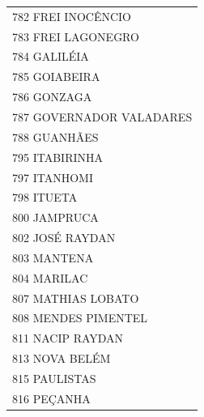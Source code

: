 \documentclass{article}
\begin{document}
\begin{longtable}[c]{m{18cm}}
\multicolumn{1}{l}{ \hspace{2em} 782 FREI INOCÊNCIO } \\
\multicolumn{1}{l}{ \hspace{2em} 783 FREI LAGONEGRO } \\
\multicolumn{1}{l}{ \hspace{2em} 784 GALILÉIA } \\
\multicolumn{1}{l}{ \hspace{2em} 785 GOIABEIRA } \\
\multicolumn{1}{l}{ \hspace{2em} 786 GONZAGA } \\
\multicolumn{1}{l}{ \hspace{2em} 787 GOVERNADOR VALADARES } \\
\multicolumn{1}{l}{ \hspace{2em} 788 GUANHÃES } \\
\multicolumn{1}{l}{ \hspace{2em} 795 ITABIRINHA } \\
\multicolumn{1}{l}{ \hspace{2em} 797 ITANHOMI } \\
\multicolumn{1}{l}{ \hspace{2em} 798 ITUETA } \\
\multicolumn{1}{l}{ \hspace{2em} 800 JAMPRUCA } \\
\multicolumn{1}{l}{ \hspace{2em} 802 JOSÉ RAYDAN } \\
\multicolumn{1}{l}{ \hspace{2em} 803 MANTENA } \\
\multicolumn{1}{l}{ \hspace{2em} 804 MARILAC } \\
\multicolumn{1}{l}{ \hspace{2em} 807 MATHIAS LOBATO } \\
\multicolumn{1}{l}{ \hspace{2em} 808 MENDES PIMENTEL } \\
\multicolumn{1}{l}{ \hspace{2em} 811 NACIP RAYDAN } \\
\multicolumn{1}{l}{ \hspace{2em} 813 NOVA BELÉM } \\
\multicolumn{1}{l}{ \hspace{2em} 815 PAULISTAS } \\
\multicolumn{1}{l}{ \hspace{2em} 816 PEÇANHA } \\

\end{longtable}
\end{document}
